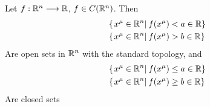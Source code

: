 \documentclass[../complete.tex]{subfiles}
\begin{document}
\begin{thm}
	Let $f:\mathbb{R}^n\overset{}{\longrightarrow}\mathbb{R}$, $f\in C(\mathbb{R}^n)$. Then
	\begin{equation}
		\begin{aligned}
			&\{\left.x^\mu\in\mathbb{R}^n\right|_{}f(x^\mu)<a\in\mathbb{R}\}\\
			&\{\left.x^\mu\in\mathbb{R}^n\right|_{}f(x^\mu)>b\in\mathbb{R}\}
		\end{aligned}
		\label{eq:opensetsfc}
	\end{equation}
	Are open sets in $\mathbb{R}^n$ with the standard topology, and
	\begin{equation}
		\begin{aligned}
			&\{\left.x^\mu\in\mathbb{R}^n\right|_{}f(x^\mu)\le a\in\mathbb{R}\}\\
			&\{\left.x^\mu\in\mathbb{R}^n\right|_{}f(x^\mu)\ge b\in\mathbb{R}\}
		\end{aligned}
		\label{eq:closedsetsfc}
	\end{equation}
	Are closed sets
\end{thm}
\end{document}
